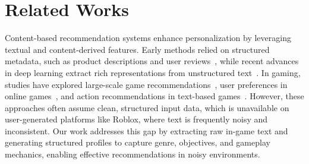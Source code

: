 \section{Related Works}

Content-based recommendation systems enhance personalization by leveraging textual and content-derived features. Early methods relied on structured metadata, such as product descriptions and user reviews~\cite{degemmis2007content,aciar2007informed}, while recent advances in deep learning extract rich representations from unstructured text~\cite{liu2024once,bondevik2024systematic}. In gaming, studies have explored large-scale game recommendations~\cite{yang2022large}, user preferences in online games~\cite{POLITOWSKI2018103}, and action recommendations in text-based games~\cite{Recommend_Actions_in_Text_Games}. However, these approaches often assume clean, structured input data, which is unavailable on user-generated platforms like Roblox, where text is frequently noisy and inconsistent. Our work addresses this gap by extracting raw in-game text and generating structured profiles to capture genre, objectives, and gameplay mechanics, enabling effective recommendations in noisy environments.

